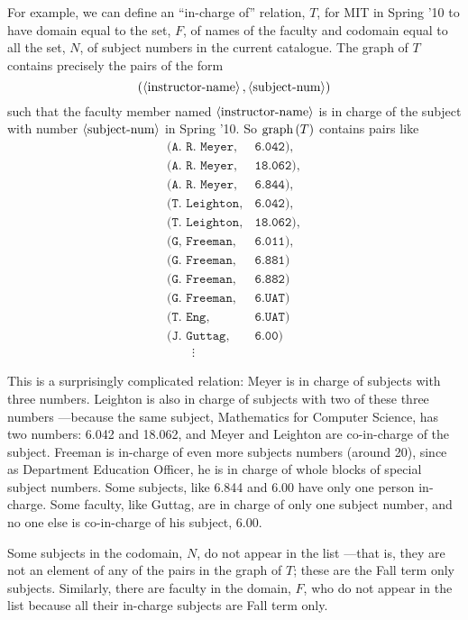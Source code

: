 For example, we can define an ``in-charge of'' relation, $T$, for MIT in
Spring '10 to have domain equal to the set, $F$, of names of the faculty
and codomain equal to all the set, $N$, of subject numbers in the current
catalogue.  The graph of $T$ contains precisely the pairs of the form
\[
(\left\langle\text{instructor-name}\right\rangle, \left\langle\text{subject-num}\right\rangle)
\]
such that the faculty member named $\left\langle\text{instructor-name}\right\rangle$ is
in charge of the subject with number $\left\langle\text{subject-num}\right\rangle$ in Spring '10.
So $\mathop{\textup{graph}}\nolimits\left(T\right)$ contains pairs like
\[\begin{array}{ll}
(\texttt{A. R. Meyer}, & \texttt{6.042}),\\
(\texttt{A. R. Meyer}, & \texttt{18.062}),\\
(\texttt{A. R. Meyer}, & \texttt{6.844}),\\
(\texttt{T. Leighton}, & \texttt{6.042}),\\
(\texttt{T. Leighton}, & \texttt{18.062}),\\
(\texttt{G, Freeman}, & \texttt{6.011}),\\
(\texttt{G. Freeman}, & \texttt{6.881})\\
(\texttt{G. Freeman}, & \texttt{6.882})\\
(\texttt{G. Freeman}, & \texttt{6.UAT})\\
(\texttt{T. Eng},      & \texttt{6.UAT})\\
(\texttt{J. Guttag},  & \texttt{6.00})\\
\qquad \vdots
\end{array}\]

This is a surprisingly complicated relation: Meyer is in charge of
subjects with three numbers.  Leighton is also in charge of subjects with
two of these three numbers ---because the same subject, Mathematics for
Computer Science, has two numbers: 6.042 and 18.062, and Meyer and
Leighton are co-in-charge of the subject.  Freeman is in-charge of even
more subjects numbers (around 20), since as Department Education Officer,
he is in charge of whole blocks of special subject numbers.  Some
subjects, like 6.844 and 6.00 have only one person in-charge.  Some
faculty, like Guttag, are in charge of only one subject number, and no one
else is co-in-charge of his subject, 6.00.

Some subjects in the codomain, $N$, do not appear in the list ---that is,
they are not an element of any of the pairs in the graph of $T$; these are
the Fall term only subjects.  Similarly, there are faculty in the domain,
$F$, who do not appear in the list because all their in-charge subjects
are Fall term only.

